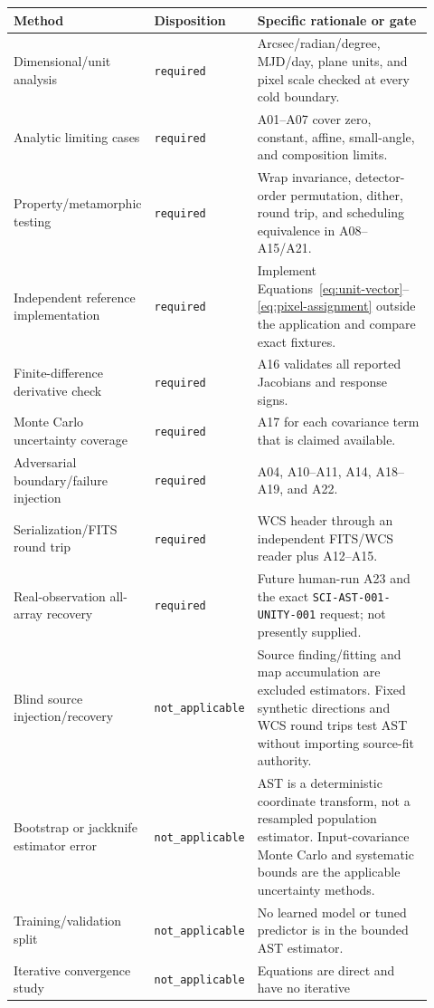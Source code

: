 \documentclass[11pt]{article}
\newcommand{\Required}{\texttt{required}}
\newcommand{\NA}{\texttt{not\_applicable}}
\begin{document}
\begin{longtable}{>{\raggedright\arraybackslash}p{0.23\linewidth}
                  >{\raggedright\arraybackslash}p{0.22\linewidth}
                  >{\raggedright\arraybackslash}p{0.47\linewidth}}
\toprule
Method & Disposition & Specific rationale or gate \\
\midrule
\endhead
Dimensional/unit analysis & \Required & Arcsec/radian/degree, MJD/day, plane
units, and pixel scale checked at every cold boundary. \\
Analytic limiting cases & \Required & A01--A07 cover zero, constant, affine,
small-angle, and composition limits. \\
Property/metamorphic testing & \Required & Wrap invariance, detector-order
permutation, dither, round trip, and scheduling equivalence in A08--A15/A21.
\\
Independent reference implementation & \Required & Implement
Equations~\eqref{eq:unit-vector}--\eqref{eq:pixel-assignment} outside the
application and compare exact fixtures. \\
Finite-difference derivative check & \Required & A16 validates all reported
Jacobians and response signs. \\
Monte Carlo uncertainty coverage & \Required & A17 for each covariance term
that is claimed available. \\
Adversarial boundary/failure injection & \Required & A04, A10--A11, A14,
A18--A19, and A22. \\
Serialization/FITS round trip & \Required & WCS header through an independent
FITS/WCS reader plus A12--A15. \\
Real-observation all-array recovery & \Required & Future human-run A23 and the
exact \texttt{SCI-AST-001-UNITY-001} request; not presently supplied. \\
Blind source injection/recovery & \NA & Source finding/fitting and map
accumulation are excluded estimators.  Fixed synthetic directions and WCS
round trips test AST without importing source-fit authority. \\
Bootstrap or jackknife estimator error & \NA & AST is a deterministic
coordinate transform, not a resampled population estimator.  Input-covariance
Monte Carlo and systematic bounds are the applicable uncertainty methods. \\
Training/validation split & \NA & No learned model or tuned predictor is in
the bounded AST estimator. \\
Iterative convergence study & \NA & Equations are direct and have no iterative

\end{longtable}
\end{document}
